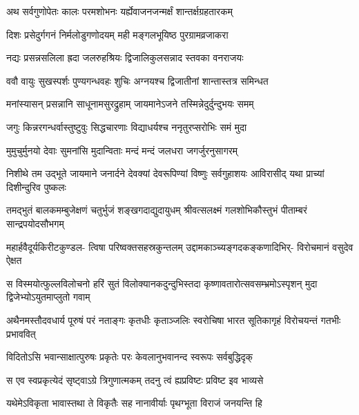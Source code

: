 

\twolineshloka
{अथ सर्वगुणोपेतः कालः परमशोभनः}
{यर्ह्येवाजनजन्मर्क्षं शान्तर्क्षग्रहतारकम्} %

\twolineshloka
{दिशः प्रसेदुर्गगनं निर्मलोडुगणोदयम्}
{मही मङ्गलभूयिष्ठ पुरग्रामव्रजाकरा} %

\twolineshloka
{नद्यः प्रसन्नसलिला ह्रदा जलरुहश्रियः}
{द्विजालिकुलसन्नाद स्तवका वनराजयः} %

\twolineshloka
{ववौ वायुः सुखस्पर्शः पुण्यगन्धवहः शुचिः}
{अग्नयश्च द्विजातीनां शान्तास्तत्र समिन्धत} %

\twolineshloka
{मनांस्यासन् प्रसन्नानि साधूनामसुरद्रुहाम्}
{जायमानेऽजने तस्मिन्नेदुर्दुन्दुभयः समम्} %

\twolineshloka
{जगुः किन्नरगन्धर्वास्तुष्टुवुः सिद्धचारणाः}
{विद्याधर्यश्च ननृतुरप्सरोभिः समं मुदा} %

\twolineshloka
{मुमुचुर्मुनयो देवाः सुमनांसि मुदान्विताः}
{मन्दं मन्दं जलधरा जगर्जुरनुसागरम्} %

\threelineshloka
{निशीथे तम उद्भूते जायमाने जनार्दने}
{देवक्यां देवरूपिण्यां विष्णुः सर्वगुहाशयः}
{आविरासीद् यथा प्राच्यां दिशीन्दुरिव पुष्कलः}

\fourlineindentedshloka
{तमद्भुतं बालकमम्बुजेक्षणं}
{चतुर्भुजं शङ्खगदाद्युदायुधम्}
{श्रीवत्सलक्ष्मं गलशोभिकौस्तुभं}
{पीताम्बरं सान्द्रपयोदसौभगम्} %

\fourlineindentedshloka
{महार्हवैदूर्यकिरीटकुण्डल-}
{त्विषा परिष्वक्तसहस्रकुन्तलम्}
{उद्दामकाञ्च्यङ्गदकङ्कणादिभिर्-}
{विरोचमानं वसुदेव ऐक्षत} %

\fourlineindentedshloka
{स विस्मयोत्फुल्लविलोचनो हरिं}
{सुतं विलोक्यानकदुन्दुभिस्तदा}
{कृष्णावतारोत्सवसम्भ्रमोऽस्पृशन्}
{मुदा द्विजेभ्योऽयुतमाप्लुतो गवाम्} %

\fourlineindentedshloka
{अथैनमस्तौदवधार्य पूरुषं}
{परं नताङ्गः कृतधीः कृताञ्जलिः}
{स्वरोचिषा भारत सूतिकागृहं}
{विरोचयन्तं गतभीः प्रभाववित्} %



\twolineshloka
{विदितोऽसि भवान्साक्षात्पुरुषः प्रकृतेः परः}
{केवलानुभवानन्द स्वरूपः सर्वबुद्धिदृक्} %

\twolineshloka
{स एव स्वप्रकृत्येदं सृष्ट्वाऽग्रे त्रिगुणात्मकम्}
{तदनु त्वं ह्यप्रविष्टः प्रविष्ट इव भाव्यसे} %

\twolineshloka
{यथेमेऽविकृता भावास्तथा ते विकृतैः सह}
{नानावीर्याः पृथग्भूता विराजं जनयन्ति हि} %

